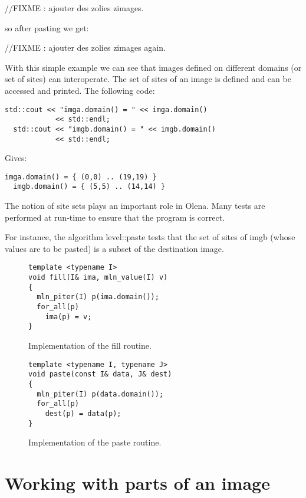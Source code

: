 \documentclass{report}
\begin{document}
//FIXME : ajouter des zolies zimages.

so after pasting we get:

//FIXME : ajouter des zolies zimages again.

With this simple example we can see that images defined on different domains (or
set of sites) can interoperate.  The set of sites of an image is defined and
can be accessed and printed. The following code:

\begin{lstlisting}[frame=single]
  std::cout << "imga.domain() = " << imga.domain()
            << std::endl;
  std::cout << "imgb.domain() = " << imgb.domain()
            << std::endl;
\end{lstlisting}

Gives:
\begin{lstlisting}[frame=single]
  imga.domain() = { (0,0) .. (19,19) }
  imgb.domain() = { (5,5) .. (14,14) }
\end{lstlisting}

The notion of site sets plays an important role in Olena. Many tests are
performed at run-time to ensure that the program is correct.

For instance, the algorithm level::paste tests that the set of sites of imgb
(whose values are to be pasted) is a subset of the destination image.


\begin{figure}[ht!]
  \begin{lstlisting}[frame=single]
template <typename I>
void fill(I& ima, mln_value(I) v)
{
  mln_piter(I) p(ima.domain());
  for_all(p)
    ima(p) = v;
}
  \end{lstlisting}
  \caption{Implementation of the fill routine.\label{fig:fill_impl}}
\end{figure} 


\begin{figure}[ht!]
  \begin{lstlisting}[frame=single]
template <typename I, typename J>
void paste(const I& data, J& dest)
{
  mln_piter(I) p(data.domain());
  for_all(p)
    dest(p) = data(p);
}
  \end{lstlisting}
  \caption{Implementation of the paste routine.\label{fig:paste_impl}}
\end{figure}


\section{Working with parts of an image}
\end{document}
